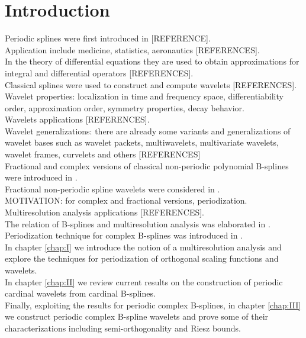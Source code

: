 \documentclass[12pt, class = report, crop = false, a4paper, twoside]{standalone}
\begin{document}
\chapter*{Introduction}

Periodic splines were first introduced in [REFERENCE]. \\
Application include medicine, statistics, aeronautics [REFERENCES]. \\

In the theory of differential equations they are used to obtain approximations for integral and differential operators [REFERENCES]. \\

Classical splines were used to construct and compute wavelets [REFERENCES]. Wavelet properties: localization in time and frequency space, differentiability order, approximation order, symmetry properties, decay behavior. \\
Wavelets applications [REFERENCES]. \\
Wavelet generalizations: there are already some variants and generalizations of wavelet bases such as wavelet packets, multiwavelets, multivariate wavelets, wavelet frames, curvelets and others [REFERENCES] \\

Fractional and complex versions of classical non-periodic polynomial B-splines were introduced in \cite{UnBl00, For+06}. \\

Fractional non-periodic spline wavelets were considered in \cite{UnBl99, UnBl00}. \\

MOTIVATION: for complex and fractional versions, periodization. Multiresolution analysis applications [REFERENCES]. \\

The relation of B-splines and multiresolution analysis was elaborated in \cite{For11}. Periodization technique for complex B-splines was introduced in \cite{For12}. \\

In chapter \ref{chap:I} we introduce the notion of a multiresolution analysis and explore the techniques for periodization of orthogonal scaling functions and wavelets. \\
In chapter \ref{chap:II} we review current results on the construction of periodic cardinal wavelets from cardinal B-splines. \\
Finally, exploiting the results for periodic complex B-splines, in chapter \ref{chap:III} we construct periodic complex B-spline wavelets and prove some of their characterizations including semi-orthogonality and Riesz bounds. \\
\end{document}
